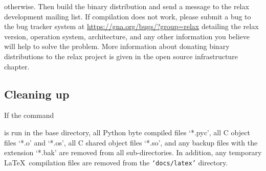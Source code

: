 
otherwise.  Then build the binary distribution and send a message to the relax development mailing list.  If compilation does not work, please submit a bug to the bug tracker system at \href{https://gna.org/bugs/?group=relax}{https://gna.org/bugs/?group=relax} detailing the relax version, operation system, architecture, and any other information you believe will help to solve the problem.  More information about donating binary distributions to the relax project is given in the open source infrastructure chapter.


\subsection{Cleaning up}

If the command


is run in the base directory, all Python byte compiled files `*.pyc', all C object files `*.o' and `*.os', all C shared object files `*.so', and any backup files with the extension `*.bak' are removed from all sub-directories.  In addition, any temporary \LaTeX\ compilation files are removed from the \texttt{`docs/latex'} directory.

